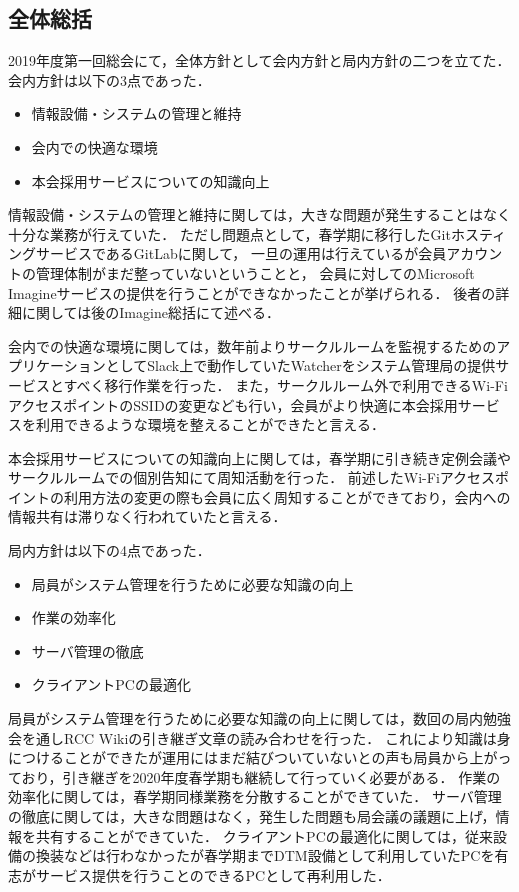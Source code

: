\subsection*{全体総括}


2019年度第一回総会にて，全体方針として会内方針と局内方針の二つを立てた．会内方針は以下の3点であった．
\begin{itemize}
  \item 情報設備・システムの管理と維持
  \item 会内での快適な環境
  \item 本会採用サービスについての知識向上
\end{itemize}

情報設備・システムの管理と維持に関しては，大きな問題が発生することはなく十分な業務が行えていた．
ただし問題点として，春学期に移行したGitホスティングサービスであるGitLabに関して，
一旦の運用は行えているが会員アカウントの管理体制がまだ整っていないということと，
会員に対してのMicrosoft Imagineサービスの提供を行うことができなかったことが挙げられる．
後者の詳細に関しては後のImagine総括にて述べる．

会内での快適な環境に関しては，数年前よりサークルルームを監視するためのアプリケーションとしてSlack上で動作していたWatcherをシステム管理局の提供サービスとすべく移行作業を行った．
また，サークルルーム外で利用できるWi-FiアクセスポイントのSSIDの変更なども行い，会員がより快適に本会採用サービスを利用できるような環境を整えることができたと言える．

本会採用サービスについての知識向上に関しては，春学期に引き続き定例会議やサークルルームでの個別告知にて周知活動を行った．
前述したWi-Fiアクセスポイントの利用方法の変更の際も会員に広く周知することができており，会内への情報共有は滞りなく行われていたと言える．

局内方針は以下の4点であった．
\begin{itemize}
  \item 局員がシステム管理を行うために必要な知識の向上
  \item 作業の効率化
  \item サーバ管理の徹底
  \item クライアントPCの最適化
\end{itemize}

局員がシステム管理を行うために必要な知識の向上に関しては，数回の局内勉強会を通しRCC Wikiの引き継ぎ文章の読み合わせを行った．
これにより知識は身につけることができたが運用にはまだ結びついていないとの声も局員から上がっており，引き継ぎを2020年度春学期も継続して行っていく必要がある．
作業の効率化に関しては，春学期同様業務を分散することができていた．
サーバ管理の徹底に関しては，大きな問題はなく，発生した問題も局会議の議題に上げ，情報を共有することができていた．
クライアントPCの最適化に関しては，従来設備の換装などは行わなかったが春学期までDTM設備として利用していたPCを有志がサービス提供を行うことのできるPCとして再利用した．
